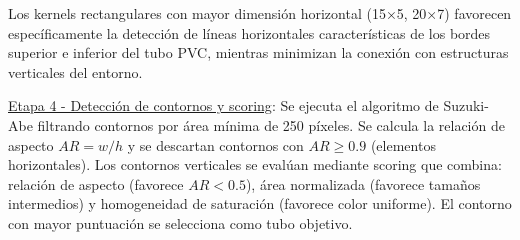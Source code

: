 Los kernels rectangulares con mayor dimensión horizontal (15×5, 20×7) favorecen específicamente la detección de líneas horizontales características de los bordes superior e inferior del tubo PVC, mientras minimizan la conexión con estructuras verticales del entorno.


\underline{Etapa 4 - Detección de contornos y scoring}: Se ejecuta el algoritmo de Suzuki-Abe filtrando contornos por área mínima de 250 píxeles. Se calcula la relación de aspecto $AR = w/h$ y se descartan contornos con $AR \geq 0.9$ (elementos horizontales). Los contornos verticales se evalúan mediante scoring que combina: relación de aspecto (favorece $AR < 0.5$), área normalizada (favorece tamaños intermedios) y homogeneidad de saturación (favorece color uniforme). El contorno con mayor puntuación se selecciona como tubo objetivo.

